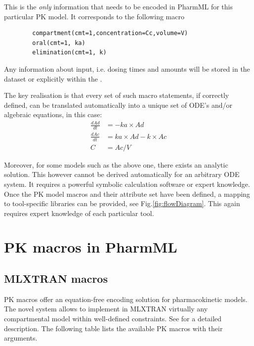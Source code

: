 This is the \emph{only} information that needs to be encoded in PharmML for this particular PK model. It 
corresponds to the following macro
\lstset{language=NONMEMdataSet}
\begin{lstlisting}
		compartment(cmt=1,concentration=Cc,volume=V) 
		oral(cmt=1, ka) 
		elimination(cmt=1, k)
\end{lstlisting}
Any information about input, i.e. dosing times and amounts will be stored in the dataset 
or explicitly within the .

The key \marginpar{\HandCuffLeft} realisation is that every set of such macro statements, 
if correctly defined, can be translated automatically into a unique set of ODE's and/or 
algebraic equations, in this case:
\begin{align}
\frac{dAd}{dt} &= -ka \times Ad \nonumber \\
\frac{dAc}{dt} &= ka \times Ad - k \times Ac  \nonumber \\
C &= Ac/V \nonumber
\end{align}

Moreover, for some models such as the above one, there exists an analytic solution. This however cannot 
be derived automatically for an arbitrary ODE system. It requires a powerful symbolic calculation 
software or expert knowledge. Once the PK model macros and their attribute set have been defined, 
a mapping to tool-specific libraries can be provided, see Fig.\ref{fig:flowDiagram}. 
This again requires expert knowledge of each particular tool. 



\section{PK macros in PharmML}
\label{subsec:PKmacros}

\subsection{MLXTRAN macros}
\label{sec:MLXTRANmacros}

PK macros offer an equation-free encoding solution for pharmacokinetic models. 
The novel system allows to implement in MLXTRAN virtually any compartmental 
model within well-defined constraints. See \cite{MLXTRANforMonolix:2014} for a detailed 
description. The following table lists the available PK macros with their arguments. 

